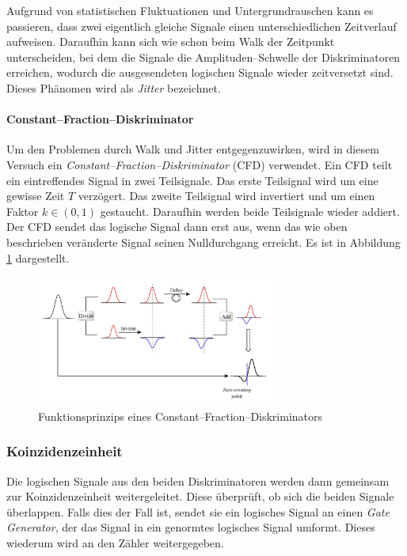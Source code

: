 \documentclass[12pt,a4paper]{scrartcl}
\numberwithin{equation}{section} %
\begin{document}
Aufgrund von statistischen Fluktuationen und Untergrundrauschen kann es passieren, dass zwei eigentlich gleiche Signale einen unterschiedlichen Zeitverlauf aufweisen. Daraufhin kann sich wie schon beim Walk der Zeitpunkt unterscheiden, bei dem die Signale die Amplituden--Schwelle der Diskriminatoren erreichen, wodurch die ausgesendeten logischen Signale wieder zeitversetzt sind. Dieses Phänomen wird als \emph{Jitter} bezeichnet.

\hypertarget{cfd}{%
\paragraph{Constant--Fraction--Diskriminator}\label{cfd}}

Um den Problemen durch Walk und Jitter entgegenzuwirken, wird in diesem Versuch ein \emph{Constant--Fraction--Diskriminator} (CFD) verwendet. Ein CFD teilt ein eintreffendes Signal in zwei Teilsignale. Das erste Teilsignal wird um eine gewisse Zeit $T$ verzögert. Das zweite Teilsignal wird invertiert und um einen Faktor $k\in(0, 1)$ gestaucht. Daraufhin werden beide Teilsignale wieder addiert. Der CFD sendet das logische Signal dann erst aus, wenn das wie oben beschrieben veränderte Signal seinen Nulldurchgang erreicht. Es ist in Abbildung \ref{abb:CFD} dargestellt.

\begin{figure}[h]
	\centering
	\includegraphics[width=0.7\textwidth]{../media/B3.4/CFD.jpg}
	\caption{Funktionsprinzips eines Constant--Fraction--Diskriminators \cite{abb:CDF}}
	\label{abb:CFD}
\end{figure}

\hypertarget{koinzidenzeinheit}{%
\subsubsection{Koinzidenzeinheit}\label{koinzidenzeinheit}}

Die logischen Signale aus den beiden Diskriminatoren werden dann gemeinsam zur Koinzidenzeinheit weitergeleitet. Diese überprüft, ob sich die beiden Signale überlappen. Falls dies der Fall ist, sendet sie ein logisches Signal an einen \emph{Gate Generator}, der das Signal in ein genormtes logisches Signal umformt. Dieses wiederum wird an den Zähler weitergegeben.
\end{document}
